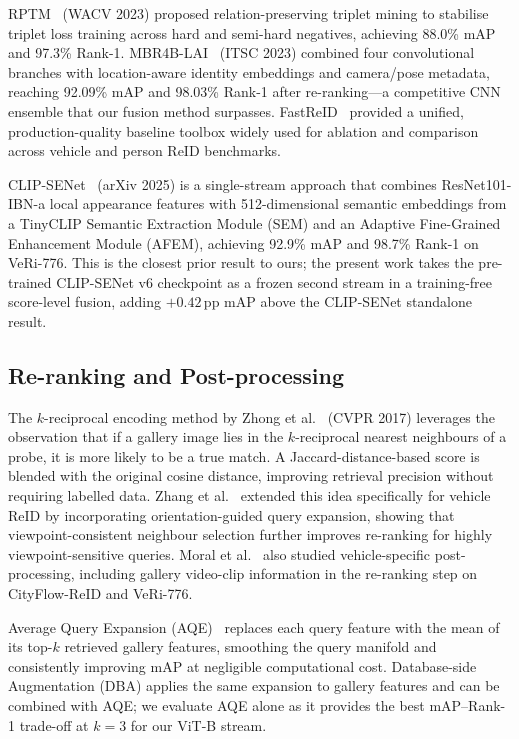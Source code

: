 \documentclass[11pt]{article}
\begin{document}
RPTM~\cite{ghosh2023rptm} (WACV 2023) proposed relation-preserving triplet
mining to stabilise triplet loss training across hard and semi-hard negatives,
achieving 88.0\% mAP and 97.3\% Rank-1.
MBR4B-LAI~\cite{luo2023mbr4b} (ITSC 2023) combined four convolutional branches
with location-aware identity embeddings and camera/pose metadata, reaching
92.09\% mAP and 98.03\% Rank-1 after re-ranking---a competitive CNN ensemble
that our fusion method surpasses.
FastReID~\cite{wang2020fastreid} provided a unified, production-quality baseline
toolbox widely used for ablation and comparison across vehicle and person ReID
benchmarks.

CLIP-SENet~\cite{lu2025clipsenet} (arXiv 2025) is a single-stream approach
that combines ResNet101-IBN-a local appearance features with 512-dimensional
semantic embeddings from a TinyCLIP Semantic Extraction Module (SEM) and an
Adaptive Fine-Grained Enhancement Module (AFEM), achieving 92.9\% mAP and
98.7\% Rank-1 on VeRi-776. This is the closest prior result to ours; the
present work takes the pre-trained CLIP-SENet v6 checkpoint as a frozen second
stream in a training-free score-level fusion, adding $+0.42$\,pp mAP above the
CLIP-SENet standalone result.

\subsection{Re-ranking and Post-processing}
The $k$-reciprocal encoding method by Zhong et al.~\cite{zhong2017rerank}
(CVPR 2017) leverages the observation that if a gallery image lies in the
$k$-reciprocal nearest neighbours of a probe, it is more likely to be a true
match. A Jaccard-distance-based score is blended with the original cosine
distance, improving retrieval precision without requiring labelled data.
Zhang et al.~\cite{zhang2022vehiclererank} extended this idea specifically
for vehicle ReID by incorporating orientation-guided query expansion, showing
that viewpoint-consistent neighbour selection further improves re-ranking
for highly viewpoint-sensitive queries. Moral et al.~\cite{moral2023syntheticrerank}
also studied vehicle-specific post-processing, including gallery video-clip
information in the re-ranking step on CityFlow-ReID and VeRi-776.

Average Query Expansion (AQE)~\cite{arandjelovic2012aqe} replaces each query
feature with the mean of its top-$k$ retrieved gallery features, smoothing the
query manifold and consistently improving mAP at negligible computational cost.
Database-side Augmentation (DBA) applies the same expansion to gallery features
and can be combined with AQE; we evaluate AQE alone as it provides the best
mAP--Rank-1 trade-off at $k{=}3$ for our ViT-B stream.
\end{document}
